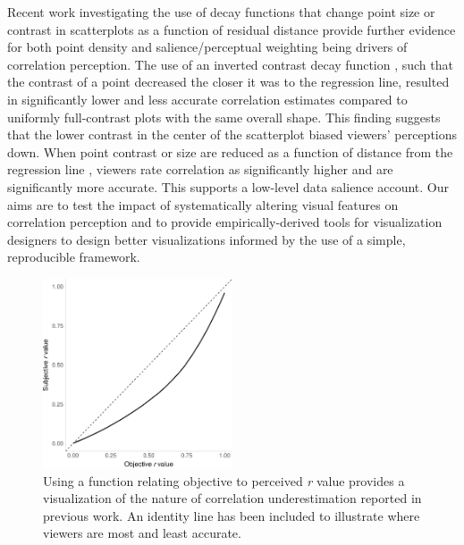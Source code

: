 \documentclass[manuscript, review, anonymous, screen]{acmart}
\begin{document}
Recent work investigating the use of decay functions that change point
size or contrast in scatterplots as a function of residual distance
provide further evidence for both point density and salience/perceptual
weighting being drivers of correlation perception. The use of an
inverted contrast decay function \citep{strain_2023}, such that the
contrast of a point decreased the closer it was to the regression line,
resulted in significantly lower and less accurate correlation estimates
compared to uniformly full-contrast plots with the same overall shape.
This finding suggests that the lower contrast in the center of the
scatterplot biased viewers' perceptions down. When point contrast or
size are reduced as a function of distance from the regression line
\citep{strain_2023, strain_2023b}, viewers rate correlation as
significantly higher and are significantly more accurate. This supports
a low-level data salience account. Our aims are to test the impact of
systematically altering visual features on correlation perception and to
provide empirically-derived tools for visualization designers to design
better visualizations informed by the use of a simple, reproducible
framework.

\begin{figure}

\includegraphics[width=0.5\textwidth,height=\textheight]{size_and_contrast_files/figure-pdf/fig-underestimation-curve-1.pdf} \hfill{}

\caption{\label{fig-underestimation-curve}Using a function relating
objective to perceived \emph{r} value \citep{rensink_2017} provides a
visualization of the nature of correlation underestimation reported in
previous work. An identity line has been included to illustrate where
viewers are most and least accurate.}

\end{figure}
\end{document}
